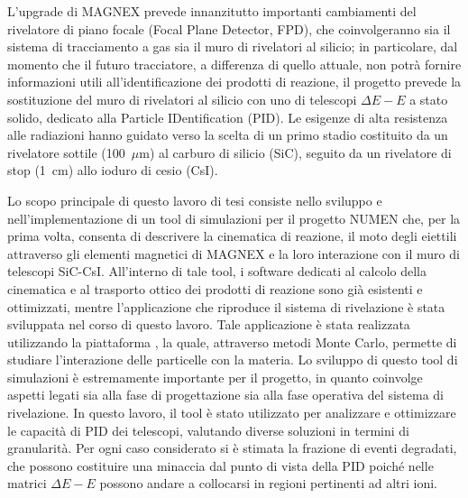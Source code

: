 L'upgrade di MAGNEX prevede innanzitutto importanti cambiamenti del rivelatore di piano focale (Focal Plane Detector, FPD), che coinvolgeranno sia il sistema di tracciamento a gas sia il muro di rivelatori al silicio; in particolare, dal momento che il futuro tracciatore, a differenza di quello attuale, non potrà fornire informazioni utili all'identificazione dei prodotti di reazione, il progetto prevede la sostituzione del muro di rivelatori al silicio con uno di telescopi $\Delta E - E$ a stato solido, dedicato alla Particle IDentification (PID). 
Le esigenze di alta resistenza alle radiazioni hanno guidato verso la scelta di un primo stadio costituito da un rivelatore sottile (100~$\mu$m) al carburo di silicio (SiC), seguito da un rivelatore di stop (1~cm) allo ioduro di cesio (CsI).

Lo scopo principale di questo lavoro di tesi consiste nello sviluppo e nell'implementazione di un tool di simulazioni per il progetto NUMEN che, per la prima volta, consenta di descrivere la cinematica di reazione, il moto degli eiettili attraverso gli elementi magnetici di MAGNEX e la loro interazione con il muro di telescopi SiC-CsI.
All'interno di tale tool, i software dedicati al calcolo della cinematica e al trasporto ottico dei prodotti di reazione sono già esistenti e ottimizzati, mentre l'applicazione che riproduce il sistema di rivelazione è stata sviluppata nel corso di questo lavoro.
Tale applicazione è stata realizzata utilizzando la piattaforma \geant{}, la quale, attraverso metodi Monte Carlo, permette di studiare l'interazione delle particelle con la materia.
Lo sviluppo di questo tool di simulazioni è estremamente importante per il progetto, in quanto coinvolge aspetti legati sia alla fase di progettazione sia alla fase operativa del sistema di rivelazione.
In questo lavoro, il tool è stato utilizzato per analizzare e ottimizzare le capacità di PID dei telescopi, valutando diverse soluzioni in termini di granularità.
Per ogni caso considerato si è stimata la frazione di eventi degradati, che possono costituire una minaccia dal punto di vista della PID poiché nelle matrici $\Delta E - E$ possono andare a collocarsi in regioni pertinenti ad altri ioni. 
